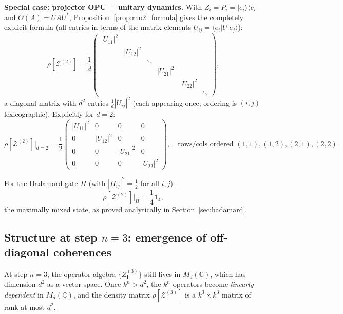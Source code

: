 \documentclass[12pt,a4paper]{article}
\begin{document}
\noindent\textbf{Special case: projector OPU + unitary dynamics.}
With $Z_i=P_i=|e_i\rangle\langle e_i|$ and $\Theta(A)=UAU^*$,
Proposition~\ref{prop:rho2_formula} gives the completely explicit formula
(all entries in terms of the matrix elements $U_{ij}=\langle e_i|U|e_j\rangle$):
\begin{equation}\label{eq:rho2_diag_display}
\rho[\mathcal{Z}^{(2)}]
=
\frac{1}{d}
\begin{pmatrix}
  |U_{11}|^2 & & & & & \\
  & |U_{12}|^2 & & & & \\
  & & \ddots & & & \\
  & & & |U_{21}|^2 & & \\
  & & & & |U_{22}|^2 & \\
  & & & & & \ddots
\end{pmatrix},
\end{equation}
a diagonal matrix with $d^2$ entries $\frac{1}{d}|U_{ij}|^2$ (each appearing
once; ordering is $(i,j)$ lexicographic).  Explicitly for $d=2$:
\begin{equation}\label{eq:rho2_d2}
\rho[\mathcal{Z}^{(2)}]\bigl|_{d=2}
= \frac{1}{2}
\begin{pmatrix}
  |U_{11}|^2 & 0          & 0          & 0          \\
  0          & |U_{12}|^2 & 0          & 0          \\
  0          & 0          & |U_{21}|^2 & 0          \\
  0          & 0          & 0          & |U_{22}|^2
\end{pmatrix},
\quad\text{rows/cols ordered }(1,1),(1,2),(2,1),(2,2).
\end{equation}

\noindent For the Hadamard gate $H$ (with $|H_{ij}|^2=\frac{1}{2}$ for all $i,j$):
\begin{equation}\label{eq:rho2_hadamard}
\rho[\mathcal{Z}^{(2)}]\bigl|_{H}
= \frac{1}{4}\mathbf{1}_4,
\end{equation}
the maximally mixed state, as proved analytically in Section~\ref{sec:hadamard}.

\subsection{Structure at step \texorpdfstring{$n=3$}{n=3}: emergence of off-diagonal coherences}

At step $n=3$, the operator algebra $\{Z^{(3)}_\mathbf{i}\}$ still lives in
$M_d(\mathbb{C})$, which has dimension $d^2$ as a vector space.  Once
$k^n > d^2$, the $k^n$ operators become \emph{linearly dependent} in
$M_d(\mathbb{C})$, and the density matrix $\rho[\mathcal{Z}^{(3)}]$ is a
$k^3\times k^3$ matrix of rank at most $d^2$.
\end{document}
